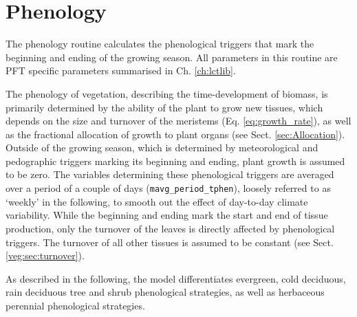 \chapter{Phenology}\label{ch:phen}

The phenology routine calculates the phenological triggers that mark the beginning and ending of the growing season. All parameters in this routine are PFT specific parameters summarised in Ch. \ref{ch:lctlib}.

The phenology of vegetation, describing the time-development of biomass, is primarily determined by the ability of the plant to grow new tissues, which depends on the size and turnover of the meristems (Eq. \ref{eq:growth_rate}), as well as the fractional allocation of growth to plant organs (see Sect. \ref{sec:Allocation}). Outside of the growing season, which is determined by meteorological and pedographic triggers marking its beginning and ending, plant growth is assumed to be zero. The variables determining these phenological triggers are averaged over a period of a couple of days (\texttt{mavg\_period\_tphen}), loosely referred to as `weekly' in the following, to smooth out the effect of day-to-day climate variability. While the beginning and ending mark the start and end of tissue production, only the turnover of the leaves is directly affected by phenological triggers. The turnover of all other tissues is assumed to be constant (see Sect. \ref{veg:sec:turnover}).

As described in the following, the model differentiates evergreen, cold deciduous, rain deciduous tree and shrub phenological strategies, as well as herbaceous perennial phenological strategies.

